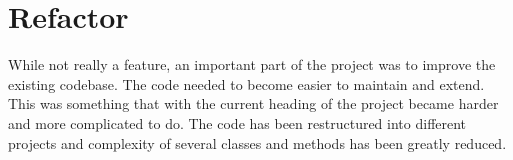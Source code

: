 \section{Refactor}
While not really a feature, an important part of the project was to improve the existing codebase. The code needed to become easier to maintain and extend. This was something that with the current heading of the project became harder and more complicated to do. The code has been restructured into different projects and complexity of several classes and methods has been greatly reduced. 
